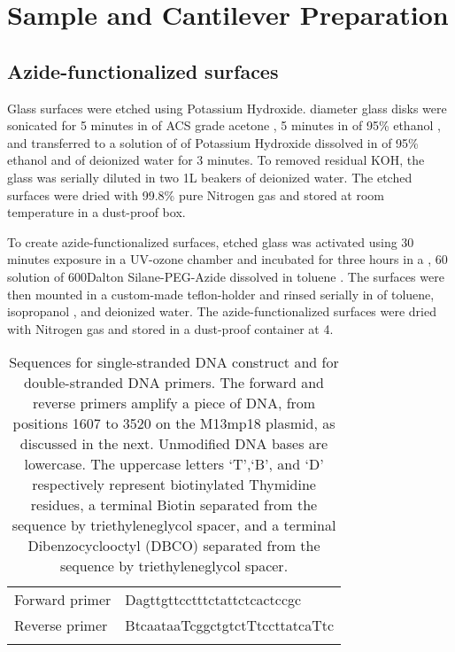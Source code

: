 \chapter{Sample and Cantilever Preparation}

\section{Azide-functionalized surfaces}

\firstp Glass surfaces were etched using Potassium Hydroxide.  diameter glass disks  were sonicated  for 5 minutes in  of ACS grade acetone , 5 minutes in  of 95\% ethanol , and transferred to a solution of  of Potassium Hydroxide  dissolved in   of 95\% ethanol and  of deionized water  for 3 minutes. To removed residual KOH, the glass was serially diluted in two 1L beakers of  deionized water. The etched surfaces were dried with 99.8\% pure Nitrogen gas  and stored at room temperature in a dust-proof box. \pl

To create azide-functionalized surfaces, etched glass was activated using 30 minutes exposure in a UV-ozone chamber  and incubated for three hours in a , 60\degreeC{} solution of  600Dalton Silane-PEG-Azide  dissolved in toluene . The surfaces were then mounted in a custom-made teflon-holder and rinsed serially in  of toluene, isopropanol , and deionized water. The azide-functionalized surfaces were dried with Nitrogen gas and stored in a dust-proof container at 4\degreeC{}. \pl 


\begin{table}[htp]
\caption[DNA primer sequences]{Sequences for single-stranded DNA construct and for double-stranded DNA primers. The forward and reverse primers amplify a  piece of DNA, from positions 1607 to 3520 on the M13mp18 plasmid, as discussed in the next. Unmodified DNA bases are lowercase. The uppercase letters `T',`B', and `D' respectively represent biotinylated Thymidine residues, a terminal Biotin separated from the sequence by triethyleneglycol spacer, and a terminal Dibenzocyclooctyl (DBCO) separated from the sequence by triethyleneglycol spacer.}
\begin{tabularx}{\textwidth}{ l | l  }
\hline \hline
Forward primer & Dagttgttcctttctattctcactccgc \\ \e 
Reverse primer & BtcaataaTcggctgtctTtccttatcaTtc \\ \e 
\end{tabularx}
\end{table}

